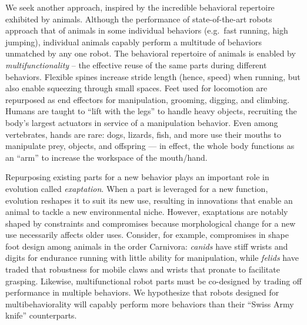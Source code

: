 \documentclass[11pt]{article}
\begin{document}
We seek another approach, inspired by the incredible behavioral repertoire exhibited by animals. %
Although the performance of state-of-the-art 
robots approach that of animals in some individual behaviors (e.g.\ fast running, high jumping), individual animals capably perform a multitude of behaviors unmatched by any one robot. 
The behavioral repertoire of animals is enabled by \emph{multifunctionality} -- the effective reuse of the same parts during different behaviors. 
Flexible spines increase stride length (hence, speed) when running, but also enable squeezing through small spaces. 
Feet used for locomotion are repurposed as end effectors for manipulation, grooming, digging, and climbing. 
Humans are taught to ``lift with the legs'' to handle heavy objects, recruiting the body's largest actuators in service of a manipulation behavior. 
Even among vertebrates, hands are rare: dogs, lizards, fish, and more use their mouths to manipulate prey, objects, and offspring --- in effect, the whole body functions as an ``arm'' to increase the workspace of the mouth/hand. 


Repurposing existing parts for a new behavior plays an important role in evolution called \emph{exaptation}. 
When a part is leveraged for a new function, evolution reshapes it to suit its new use, resulting in innovations that enable an animal to tackle a new environmental niche. 
However, exaptations are notably shaped by constraints and compromises because morphological change for a new use necessarily affects older uses.  
Consider, for example, compromises in shape foot design among animals in the order Carnivora: 
\emph{canids} have stiff wrists and digits for endurance running with little ability for manipulation, 
while 
\emph{felids} have traded that robustness for mobile claws and wrists that pronate to facilitate grasping. 
Likewise, multifunctional robot parts must be co-designed by trading off performance in multiple behaviors.
We hypothesize that robots designed for multibehaviorality will capably perform more behaviors than their ``Swiss Army knife'' counterparts.
\end{document}
